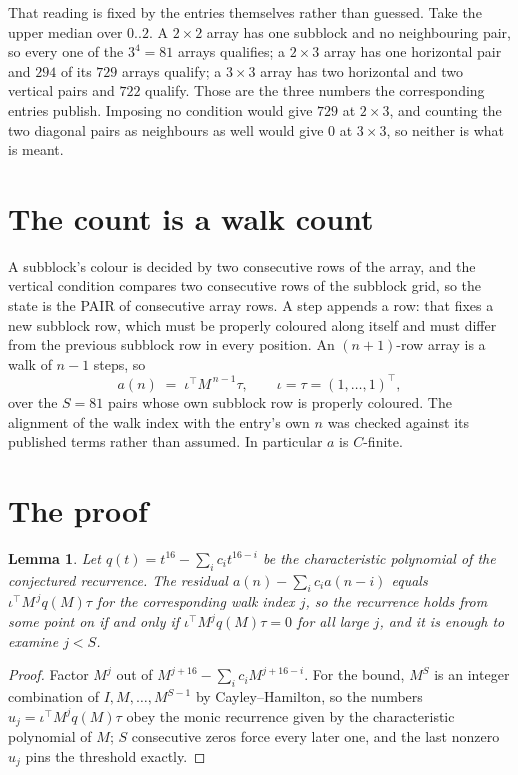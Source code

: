 \documentclass[11pt,a4paper]{article}
\theoremstyle{plain}
\newtheorem{lemma}[theorem]{Lemma}
\theoremstyle{definition}
\begin{document}
That reading is fixed by the entries themselves rather than guessed. Take the upper median
over $0..2$. A $2\times2$ array has one subblock and no neighbouring pair, so every one of the
$3^4=81$ arrays qualifies; a $2\times3$ array has one horizontal pair and $294$ of its $729$
arrays qualify; a $3\times3$ array has two horizontal and two vertical pairs and $722$
qualify. Those are the three numbers the corresponding entries publish. Imposing no condition
would give $729$ at $2\times3$, and counting the two diagonal pairs as neighbours as well
would give $0$ at $3\times3$, so neither is what is meant.

\section{The count is a walk count}

A subblock's colour is decided by two consecutive rows of the array, and
the vertical condition compares two consecutive rows of the subblock grid, so the state is the
PAIR of consecutive array rows. A step appends a row: that fixes a new subblock row, which
must be properly coloured along itself and must differ from the previous subblock row in every
position. An $(n+1)$-row array is a walk of $n-1$ steps, so
\[
a(n)\;=\;\iota^{\!\top}M^{\,n-1}\tau,\qquad\iota=\tau=(1,\dots,1)^{\!\top},
\]
over the $S=81$ pairs whose own subblock row is properly coloured.
The alignment of the walk index with the entry's own $n$ was checked against its published
terms rather than assumed. In particular $a$ is $C$-finite.

\section{The proof}

\begin{lemma}\label{lem:crit}
Let $q(t)=t^{16}-\sum_i c_it^{16-i}$ be the characteristic polynomial of the
conjectured recurrence. The residual $a(n)-\sum_ic_ia(n-i)$ equals
$\iota^{\!\top}M^{\,j}q(M)\tau$ for the corresponding walk index $j$, so the recurrence
holds from some point on if and only if $\iota^{\!\top}M^{j}q(M)\tau=0$ for all large $j$,
and it is enough to examine $j<S$.
\end{lemma}

\begin{proof}
Factor $M^{j}$ out of $M^{j+16}-\sum_ic_iM^{j+16-i}$. For the bound, $M^{S}$
is an integer combination of $I,M,\dots,M^{S-1}$ by Cayley--Hamilton, so the numbers
$u_j=\iota^{\!\top}M^{j}q(M)\tau$ obey the monic recurrence given by the characteristic
polynomial of $M$; $S$ consecutive zeros force every later one, and the last nonzero $u_j$
pins the threshold exactly.
\end{proof}
\end{document}
